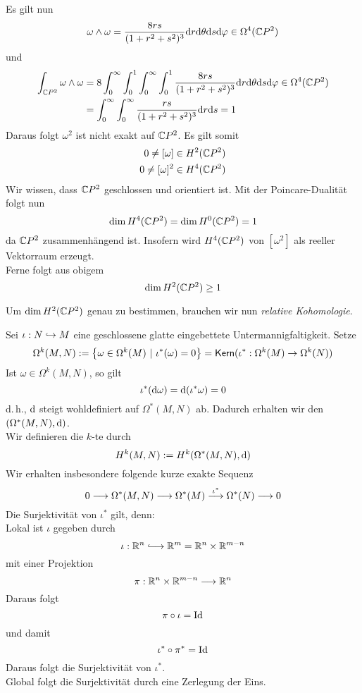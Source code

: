 Es gilt nun
\[ \omega \wedge \omega = \frac{8rs}{(1+ r^2 + s^2)^3}\text{d} r\text{d}\theta \text{d} s \text{d} \varphi \in \Omega^4(\mathbb{C} P ^2)  \]
und
\begin{align*}
\int_{\mathbb{C} P^2} \omega \wedge \omega  &= 8
\int_{0}^{\infty}\int_{0}^{1}\int_{0}^{\infty}\int_{0}^{1}
\frac{8rs}{(1+ r^2 + s^2)^3}\text{d} r\text{d}\theta \text{d} s \text{d} \varphi \in \Omega^4(\mathbb{C} P ^2)\\
&= \int_{0}^{\infty}\int_{0}^{\infty} \frac{rs}{(1 + r^2 +s^2)^3} \text{d} r \text{d} s = 1
\end{align*}
Daraus folgt $\omega^2$ ist nicht exakt auf $\mathbb{C} P^2$. Es gilt somit
\begin{align*}
0\neq [\omega] &\in H^2(\mathbb{C} P^2)\\
0\neq [\omega]^2 &\in H^4(\mathbb{C} P^2)
\end{align*}
Wir wissen, dass $\mathbb{C} P^2$ geschlossen und orientiert ist. Mit der Poincare-Dualität folgt nun
\[\dim H^4(\mathbb{C} P^2) = \dim H^0(\mathbb{C} P^2) = 1 \]
da $\mathbb{C} P ^2$ zusammenhängend ist. Insofern wird $H^4(\mathbb{C} P^2)$ von $[\omega^2]$ als reeller Vektorraum erzeugt.\\
Ferne folgt aus obigem
\[ \dim H^2(\mathbb{C} P^2) \geq 1 \]

Um $\dim H^2(\mathbb{C} P^2)$ genau zu bestimmen, brauchen wir nun \textit{relative Kohomologie}.

Sei $\iota : N \overset{}{\hookrightarrow} M$ eine geschlossene glatte eingebettete Untermannigfaltigkeit. Setze
\[ \Omega^k(M, N) :=
\set{\omega \in \Omega^k(M)}{ \iota^*(\omega) = 0 }
= \Ker (\iota^* : \Omega^k(M) \pfeil{} \Omega^k(N) ) \]
Ist $\omega \in \Omega^k(M,N)$, so gilt
\[ \iota^*(\text{d} \omega) = \text{d} (\iota^*\omega) = 0 \]
d.\,h., $\text{d}$ steigt wohldefiniert auf $\Omega^*(M,N)$ ab. Dadurch erhalten wir den  $(\Omega^*(M,N), \text{d})$.\\
Wir definieren die $k$-te  durch
\[ H^k(M,N) := H^k(\Omega^*(M,N), \text{d}) \]
Wir erhalten insbesondere folgende kurze exakte Sequenz
\[ 0 \overset{}{\longrightarrow} \Omega^*(M,N) \overset{}{\longrightarrow} \Omega^*(M) \overset{\iota^*}{\longrightarrow} \Omega^*(N) \overset{}{\longrightarrow} 0 \]
Die Surjektivität von $\iota^*$ gilt, denn:\\
Lokal ist $\iota$ gegeben durch
\[ \iota : \R^n \Inj{} \R^m = \R^n \times \R^{m-n} \]
mit einer Projektion
\[ \pi : \mathbb{R}^n \times \mathbb{R}^{m-n} \overset{}{\longrightarrow} \mathbb{R}^n \]
Daraus folgt
\[ \pi \circ \iota = \text{Id}_{} \]
und damit
\[ \iota^* \circ \pi^* = \text{Id}_{} \]
Daraus folgt die Surjektivität von $\iota^*$.\\
Global folgt die Surjektivität durch eine Zerlegung der Eins.\\


